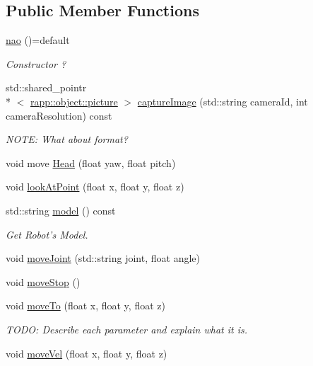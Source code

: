 \subsection*{Public Member Functions}
\begin{DoxyCompactItemize}
\item 
\hyperlink{classrapp_1_1robot_1_1nao_a00956d04e6061d875e0352c360e4d8a6}{nao} ()=default
\begin{DoxyCompactList}\small\item\em Constructor ? \end{DoxyCompactList}\item 
std\-::shared\-\_\-pointr\\*
$<$ \hyperlink{classrapp_1_1object_1_1picture}{rapp\-::object\-::picture} $>$ \hyperlink{classrapp_1_1robot_1_1nao_a276172d720ce8387a3fe695e02753af0}{capture\-Image} (std\-::string camera\-Id, int camera\-Resolution) const 
\begin{DoxyCompactList}\small\item\em N\-O\-T\-E\-: What about format? \end{DoxyCompactList}\item 
void move \hyperlink{classrapp_1_1robot_1_1nao_a4b99876e6fa503830cd1a8c93267eb9f}{Head} (float yaw, float pitch)
\item 
void \hyperlink{classrapp_1_1robot_1_1nao_a8a3d202cdc642ffcc0d6678a0b3b62c5}{look\-At\-Point} (float x, float y, float z)
\item 
std\-::string \hyperlink{classrapp_1_1robot_1_1nao_aed3ffea92e69e9e0fba684c42f5f7cfd}{model} () const 
\begin{DoxyCompactList}\small\item\em Get Robot's Model. \end{DoxyCompactList}\item 
void \hyperlink{classrapp_1_1robot_1_1nao_a313e2ddb5b0d08e96bf79b29542f0b40}{move\-Joint} (std\-::string joint, float angle)
\item 
void \hyperlink{classrapp_1_1robot_1_1nao_a50e3841d836ccaa74852c083297beb7b}{move\-Stop} ()
\item 
void \hyperlink{classrapp_1_1robot_1_1nao_a7404089508af1b7a2872a29990fc6dc2}{move\-To} (float x, float y, float z)
\begin{DoxyCompactList}\small\item\em T\-O\-D\-O\-: Describe each parameter and explain what it is. \end{DoxyCompactList}\item 
void \hyperlink{classrapp_1_1robot_1_1nao_a8b2a03a5e46e86d0aedb1d239ffcdcf9}{move\-Vel} (float x, float y, float z)

\end{DoxyCompactItemize}
